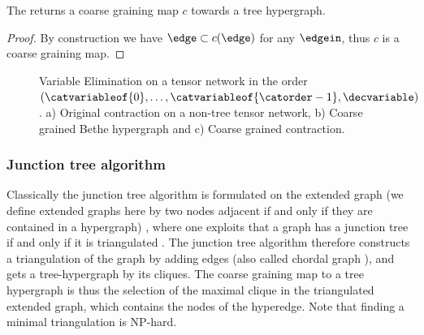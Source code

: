 \begin{lemma}
    The  returns a coarse graining map $c$ towards a tree hypergraph.
\end{lemma}
\begin{proof}
    By construction we have $\edge\subset c(\edge)$ for any $\edgein$, thus $c$ is a coarse graining map.

\end{proof}

\begin{figure}
    
    \caption{Variable Elimination on a tensor network in the order $(\catvariableof{0},\ldots,\catvariableof{\catorder-1},\decvariable)$.
    a) Original contraction on a non-tree tensor network, b) Coarse grained Bethe hypergraph and c) Coarse grained contraction.
    }
\end{figure}


\subsubsection{Junction tree algorithm}

Classically the junction tree algorithm is formulated on the extended graph (we define extended graphs here by two nodes adjacent if and only if they are contained in a hypergraph) \cite{lauritzen_local_1988}, where one exploits that a graph has a junction tree if and only if it is triangulated \cite{lauritzen_graphical_1996}.
The junction tree algorithm therefore constructs a triangulation of the graph by adding edges (also called chordal graph \cite{koller_probabilistic_2009}), and gets a tree-hypergraph by its cliques.
The coarse graining map to a tree hypergraph is thus the selection of the maximal clique in the triangulated extended graph, which contains the nodes of the hyperedge.
Note that finding a minimal triangulation is $\mathrm{NP}$-hard.

%
